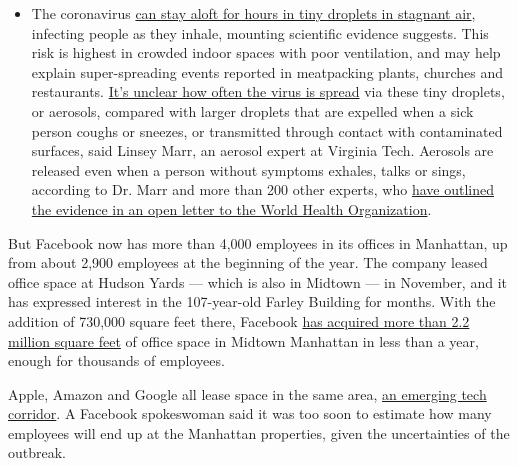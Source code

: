 \begin{itemize}
  \begin{itemize}
  \tightlist
  \item
    The coronavirus
    \href{https://www.nytimes.com/2020/07/04/health/239-experts-with-one-big-claim-the-coronavirus-is-airborne.html?action=click\&pgtype=Article\&state=default\&region=MAIN_CONTENT_3\&context=storylines_faq}{can
    stay aloft for hours in tiny droplets in stagnant air}, infecting
    people as they inhale, mounting scientific evidence suggests. This
    risk is highest in crowded indoor spaces with poor ventilation, and
    may help explain super-spreading events reported in meatpacking
    plants, churches and restaurants.
    \href{https://www.nytimes.com/2020/07/06/health/coronavirus-airborne-aerosols.html?action=click\&pgtype=Article\&state=default\&region=MAIN_CONTENT_3\&context=storylines_faq}{It's
    unclear how often the virus is spread} via these tiny droplets, or
    aerosols, compared with larger droplets that are expelled when a
    sick person coughs or sneezes, or transmitted through contact with
    contaminated surfaces, said Linsey Marr, an aerosol expert at
    Virginia Tech. Aerosols are released even when a person without
    symptoms exhales, talks or sings, according to Dr. Marr and more
    than 200 other experts, who
    \href{https://academic.oup.com/cid/article/doi/10.1093/cid/ciaa939/5867798}{have
    outlined the evidence in an open letter to the World Health
    Organization}.
  \end{itemize}
\end{itemize}

But Facebook now has more than 4,000 employees in its offices in
Manhattan, up from about 2,900 employees at the beginning of the year.
The company leased office space at Hudson Yards --- which is also in
Midtown --- in November, and it has expressed interest in the
107-year-old Farley Building for months. With the addition of 730,000
square feet there, Facebook
\href{https://www.nytimes.com/2020/01/05/nyregion/nyc-tech-facebook-amazon-google.html}{has
acquired more than 2.2 million square feet} of office space in Midtown
Manhattan in less than a year, enough for thousands of employees.

Apple, Amazon and Google all lease space in the same area,
\href{https://www.nytimes.com/2020/01/05/nyregion/nyc-tech-facebook-amazon-google.html}{an
emerging tech corridor}. A Facebook spokeswoman said it was too soon to
estimate how many employees will end up at the Manhattan properties,
given the uncertainties of the outbreak.

